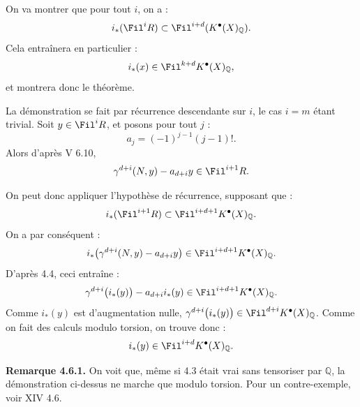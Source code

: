 
On va
montrer que pour tout \(i\), on a :
\[
  i_*(\Fil^iR)\subset \Fil^{i+d}(K^{\bullet}(X)_{\mathbb Q}).
\]
Cela entraînera en particulier :
\[
  i_*(x)\in\Fil^{k+d}K^{\bullet}(X)_{\mathbb Q},
\]
et montrera donc le théorème.

La démonstration se fait par récurrence descendante sur \(i\), le cas \(i=m\) étant trivial. Soit \(y\in\Fil^iR\), et posons pour tout \(j\) :
\[
  a_j=(-1)^{j-1}(j-1)!.
\]
Alors d'après V 6.10,
\[
  \gamma^{d+i}(N,y)-a_{d+i}y\in\Fil^{i+1}R.
\]

On peut donc appliquer l'hypothèse de récurrence, supposant que :
\[
  i_*(\Fil^{i+1}R)\subset \Fil^{i+d+1}K^{\bullet}(X)_{\mathbb Q}.
\]
On a par conséquent :
\[
  i_*\bigl(\gamma^{d+i}(N,y)-a_{d+i}y\bigr)
  \in\Fil^{i+d+1}K^{\bullet}(X)_{\mathbb Q}.
\]
D'après 4.4, ceci entraîne :
\[
  \gamma^{d+i}\bigl(i_*(y)\bigr)-a_{d+i}i_*(y)
  \in\Fil^{i+d+1}K^{\bullet}(X)_{\mathbb Q}.
\]
Comme \(i_*(y)\) est d'augmentation nulle, \(\gamma^{d+i}\bigl(i_*(y)\bigr)\in\Fil^{d+i}K^{\bullet}(X)_{\mathbb Q}\).
Comme on fait des calculs modulo torsion, on trouve donc :
\[
  i_*(y)\in\Fil^{i+d}K^{\bullet}(X)_{\mathbb Q}.
\]

\textbf{Remarque 4.6.1.} On voit que, même si 4.3 était vrai sans tensoriser par \(\mathbb Q\), la démonstration ci-dessus ne marche que modulo torsion. Pour un contre-exemple, voir XIV 4.6.

